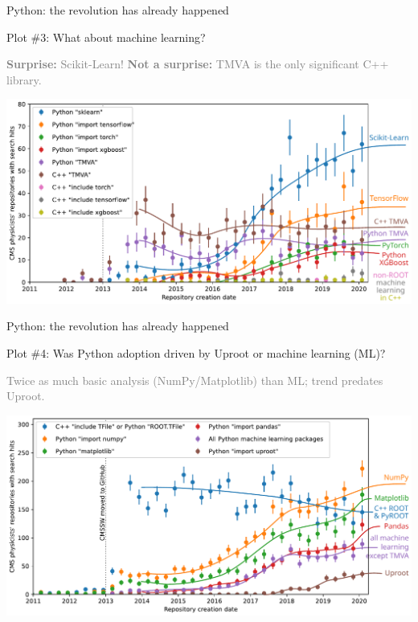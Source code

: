 \documentclass[aspectratio=169]{beamer}
\begin{document}
\begin{frame}{Python: the revolution has already happened}
\large
\vspace{0.5 cm}

Plot \#3: What about machine learning?

\normalsize
\textcolor{gray}{{\bf Surprise:} Scikit-Learn! {\bf Not a surprise:} TMVA is the only significant C++ library.}

\begin{center}
\includegraphics[width=0.85\linewidth]{img/04-github-machine-learning.pdf}
\end{center}
\end{frame}

\begin{frame}{Python: the revolution has already happened}
\large
\vspace{0.5 cm}

Plot \#4: Was Python adoption driven by Uproot or machine learning (ML)?

\normalsize
\textcolor{gray}{Twice as much basic analysis (NumPy/Matplotlib) than ML; trend predates Uproot.}

\begin{center}
\includegraphics[width=0.85\linewidth]{img/05-github-anyroot-python-machinelearning-uproot.pdf}
\end{center}
\end{frame}
\end{document}
